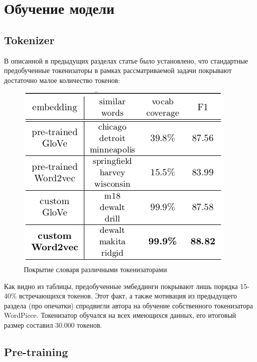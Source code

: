 \documentclass[12pt,a4paper]{article}
\begin{document}
  
\section{Обучение модели}

\subsection{Tokenizer}

В описанной в предыдущих разделах статье \cite{ner} было установлено, что стандартные предобученные токенизаторы в рамках рассматриваемой задачи покрывают достаточно малое количество токенов:

\begin{figure}[H]
	\begin{center}
		\includegraphics[scale=0.4]{tab2.jpg}
	\end{center}
	\caption{Покрытие словаря различными токенизаторами \cite{ner}}
\end{figure}

\noindent Как видно из таблицы, предобученные эмбеддинги покрывают лишь порядка 15-40\% встречающихся токенов. Этот факт, а также мотивация из предыдущего раздела (про опечатки) спродвигли автора на обучение собственного токенизатора WordPiece. Токенизатор обучался на всех имеющихся данных, его итоговый размер составил 30.000 токенов.

\subsection{Pre-training}
\end{document}
